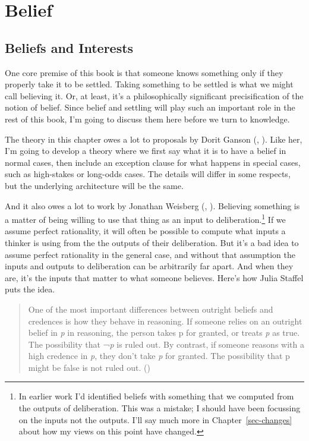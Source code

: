 \documentclass[
  10pt,
  letterpaper,
  twoside]{scrbook}
\begin{document}

\chapter{Belief}\label{sec-belief}

\section{Beliefs and Interests}\label{sec-beliefsinterests}

One core premise of this book is that someone knows something only if
they properly take it to be settled. Taking something to be settled is
what we might call believing it. Or, at least, it's a philosophically
significant precisification of the notion of belief. Since belief and
settling will play such an important role in the rest of this book, I'm
going to discuss them here before we turn to knowledge.

The theory in this chapter owes a lot to proposals by Dorit Ganson
(, ). Like
her, I'm going to develop a theory where we first say what it is to have
a belief in normal cases, then include an exception clause for what
happens in special cases, such as high-stakes or long-odds cases. The
details will differ in some respects, but the underlying architecture
will be the same.

And it also owes a lot to work by Jonathan Weisberg
(, ).
Believing something is a matter of being willing to use that thing as an
input to deliberation.\footnote{In earlier work I'd identified beliefs
  with something that we computed from the outputs of deliberation. This
  was a mistake; I should have been focussing on the inputs not the
  outputs. I'll say much more in Chapter~\ref{sec-changes} about how my
  views on this point have changed.} If we assume perfect rationality,
it will often be possible to compute what inputs a thinker is using from
the the outputs of their deliberation. But it's a bad idea to assume
perfect rationality in the general case, and without that assumption the
inputs and outputs to deliberation can be arbitrarily far apart. And
when they are, it's the inputs that matter to what someone believes.
Here's how Julia Staffel puts the idea.

\begin{quote}
One of the most important differences between outright beliefs and
credences is how they behave in reasoning. If someone relies on an
outright belief in \emph{p} in reasoning, the person takes p for
granted, or treats \emph{p} as true. The possibility that ¬\emph{p} is
ruled out. By contrast, if someone reasons with a high credence in
\emph{p}, they don't take \emph{p} for granted. The possibility that p
might be false is not ruled out. ()
\end{quote}
\end{document}
